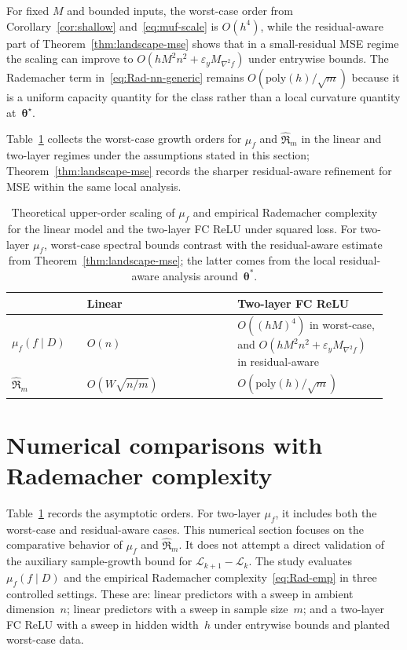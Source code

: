 \documentclass[10pt,letterpaper]{article}
\theoremstyle{definition}
\begin{document}
For fixed $M$ and bounded inputs, the worst-case order from Corollary~\ref{cor:shallow} and~\eqref{eq:muf-scale} is $O(h^4)$, while the residual-aware part of Theorem~\ref{thm:landscape-mse} shows that in a small-residual MSE regime the scaling can improve to $O(hM^2n^2 + \varepsilon_y M_{\nabla^2 f})$ under entrywise bounds.
The Rademacher term in~\eqref{eq:Rad-nn-generic} remains $O(\mathrm{poly}(h)/\sqrt{m})$ because it is a uniform capacity quantity for the class rather than a local curvature quantity at~$\boldsymbol{\theta}^\star$.

Table~\ref{tab:compare-two} collects the worst-case growth orders for $\mu_f$ and $\hat{\mathfrak{R}}_m$ in the linear and two-layer regimes under the assumptions stated in this section; Theorem~\ref{thm:landscape-mse} records the sharper residual-aware refinement for MSE within the same local analysis.

\begin{table}[t]
\centering
\caption{Theoretical upper-order scaling of $\mu_f$ and empirical Rademacher complexity for the linear model and the two-layer FC ReLU under squared loss. For two-layer $\mu_f$, worst-case spectral bounds contrast with the residual-aware estimate from Theorem~\ref{thm:landscape-mse}; the latter comes from the local residual-aware analysis around~$\boldsymbol{\theta}^*$.}
\label{tab:compare-two}
\small
\setlength{\tabcolsep}{5pt}
\begin{tabular}{@{}p{0.19\linewidth}p{0.38\linewidth}p{0.38\linewidth}@{}}
\toprule
 & Linear & Two-layer FC ReLU \\
\midrule
$\mu_f(f\mid D)$ &
$O(n)$&
$O((hM)^4)$ in worst-case, and $O(hM^2n^2+\varepsilon_y M_{\nabla^2 f})$ in residual-aware \\
\addlinespace[0.35em]
$\hat{\mathfrak{R}}_m$ &
$O(W\sqrt{n/m})$ &
$O(\mathrm{poly}(h)/\sqrt{m})$ \\
\bottomrule
\end{tabular}
\end{table}

\section{Numerical comparisons with Rademacher complexity}\label{sec:experiments}

Table~\ref{tab:compare-two} records the asymptotic orders. For two-layer $\mu_f$, it includes both the worst-case and residual-aware cases.
This numerical section focuses on the comparative behavior of $\mu_f$ and $\hat{\mathfrak{R}}_m$. It does not attempt a direct validation of the auxiliary sample-growth bound for $\mathcal{L}_{k+1}-\mathcal{L}_k$.
The study evaluates $\mu_f(f\mid D)$ and the empirical Rademacher complexity~\eqref{eq:Rad-emp} in three controlled settings. These are: linear predictors with a sweep in ambient dimension~$n$; linear predictors with a sweep in sample size~$m$; and a two-layer FC ReLU with a sweep in hidden width~$h$ under entrywise bounds and planted worst-case data.
\end{document}
